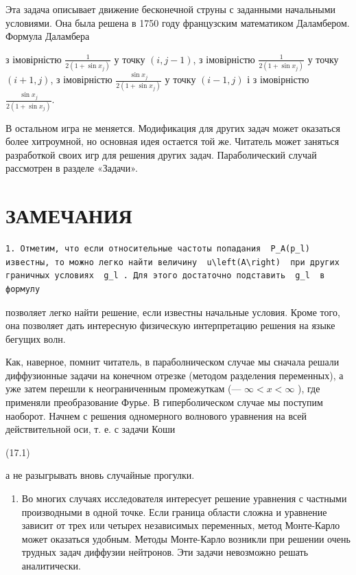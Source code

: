 \documentclass[
  ukrainian,
]{article}
\providecommand{\tightlist}{%
  \setlength{\itemsep}{0pt}\setlength{\parskip}{0pt}}
\begin{document}
Эта задача описывает движение бесконечной струны с заданными начальными
условиями. Она была решена в 1750 году французским математиком
Даламбером. Формула Даламбера

з імовірністю \(\frac{1}{2(1+\sin x_j)}\) у точку \((i, j-1)\), з
імовірністю \(\frac{1}{2(1+\sin x_j)}\) у точку \((i+1, j)\), з
імовірністю \(\frac{\sin x_j}{2(1+\sin x_j)}\) у точку \((i-1, j)\) і з
імовірністю \(\frac{\sin x_j}{2(1+\sin x_j)}\).

В остальном игра не меняется. Модификация для других задач может
оказаться более хитроумной, но основная идея остается той же. Читатель
может заняться разработкой своих игр для решения других задач.
Параболический случай рассмотрен в разделе «Задачи».

\section{ЗАМЕЧАНИЯ}\label{ux437ux430ux43cux435ux447ux430ux43dux438ux44f-2}

\begin{verbatim}
1. Отметим, что если относительные частоты попадания  P_A(p_l)  известны, то можно легко найти величину  u\left(A\right)  при других граничных условиях  g_l . Для этого достаточно подставить  g_l  в формулу
\end{verbatim}

позволяет легко найти решение, если известны начальные условия. Кроме
того, она позволяет дать интересную физическую интерпретацию решения на
языке бегущих волн.

Как, наверное, помнит читатель, в параболническом случае мы сначала
решали диффузионные задачи на конечном отрезке (методом разделения
переменных), а уже затем перешли к неограниченным промежуткам (---
\(\infty < x < \infty\) ), где применяли преобразование Фурье. В
гиперболическом случае мы поступим наоборот. Начнем с решения
одномерного волнового уравнения на всей действительной оси, т. е. с
задачи Коши

(17.1)

а не разыгрывать вновь случайные прогулки.

\begin{enumerate}
\def\labelenumi{\arabic{enumi}.}
\setcounter{enumi}{1}
\tightlist
\item
  Во многих случаях исследователя интересует решение уравнения с
  частными производными в одной точке. Если граница области сложна и
  уравнение зависит от трех или четырех независимых переменных, метод
  Монте-Карло может оказаться удобным. Методы Монте-Карло возникли при
  решении очень трудных задач диффузии нейтронов. Эти задачи невозможно
  решать аналитически.
\end{enumerate}
\end{document}
